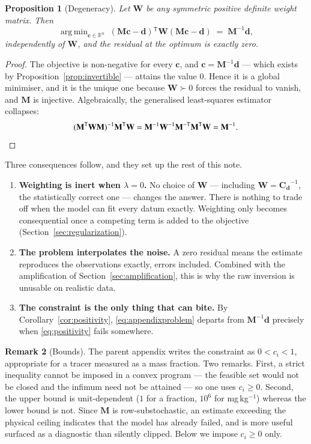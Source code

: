\documentclass[11pt]{article}
\newcommand{\cvec}{\ensuremath{\mathbf{c}}\xspace}
\newcommand{\dvec}{\ensuremath{\mathbf{d}}\xspace}
\newcommand{\Mmat}{\ensuremath{\mathbf{M}}\xspace}
\newcommand{\Wmat}{\ensuremath{\mathbf{W}}\xspace}
\newcommand{\Cd}{\ensuremath{\mathbf{C}_{\mathbf{d}}}\xspace}
\newcommand{\Reals}{\ensuremath{\mathbb{R}}\xspace}
\newcommand{\transpose}{\ensuremath{^{\mathsf{T}}}}
\DeclareMathOperator*{\argmin}{arg\,min}
\newtheorem{theorem}{Proposition}
\theoremstyle{definition}
\newtheorem{remark}[theorem]{Remark}
\begin{document}
\begin{theorem}[Degeneracy]\label{prop:degenerate}
Let $\Wmat$ be any symmetric positive definite weight matrix. Then
\begin{equation}
  \argmin_{\cvec \in \Reals^n} \; (\Mmat\cvec - \dvec)\transpose \Wmat (\Mmat\cvec - \dvec)
  \;=\; \Mmat^{-1}\dvec ,
\end{equation}
independently of $\Wmat$, and the residual at the optimum is exactly zero.
\end{theorem}

\begin{proof}
The objective is non-negative for every \cvec, and $\cvec = \Mmat^{-1}\dvec$ --- which exists
by Proposition~\ref{prop:invertible} --- attains the value $0$. Hence it is a global minimiser, and
it is the unique one because $\Wmat \succ 0$ forces the residual to vanish, and $\Mmat$ is
injective. Algebraically, the generalised least-squares estimator collapses:
\[
  (\Mmat\transpose\Wmat\Mmat)^{-1}\Mmat\transpose\Wmat
  = \Mmat^{-1}\Wmat^{-1}\Mmat^{-\mathsf{T}}\Mmat\transpose\Wmat
  = \Mmat^{-1} . \qedhere
\]
\end{proof}

\noindent Three consequences follow, and they set up the rest of this note.

\begin{enumerate}
  \item \textbf{Weighting is inert when $\lambda = 0$.} No choice of $\Wmat$ --- including
        $\Wmat = \Cd^{-1}$, the statistically correct one --- changes the answer. There is
        nothing to trade off when the model can fit every datum exactly. Weighting only
        becomes consequential once a competing term is added to the objective
        (Section~\ref{sec:regularization}).
  \item \textbf{The problem interpolates the noise.} A zero residual means the estimate
        reproduces the observations exactly, errors included. Combined with the amplification
        of Section~\ref{sec:amplification}, this is why the raw inversion is unusable on
        realistic data.
  \item \textbf{The constraint is the only thing that can bite.} By
        Corollary~\ref{cor:positivity}, \eqref{eq:appendixproblem} departs from
        $\Mmat^{-1}\dvec$ precisely when \eqref{eq:positivity} fails somewhere.
\end{enumerate}

\begin{remark}[Bounds]
The parent appendix writes the constraint as $0 < c_i < 1$, appropriate for a tracer measured
as a mass fraction. Two remarks. First, a strict inequality cannot be imposed in a convex
program --- the feasible set would not be closed and the infimum need not be attained --- so
one uses $c_i \ge 0$. Second, the upper bound is unit-dependent ($1$ for a fraction, $10^6$ for
mg\,kg$^{-1}$) whereas the lower bound is not. Since $\Mmat$ is row-substochastic, an estimate
exceeding the physical ceiling indicates that the model has already failed, and is more useful
surfaced as a diagnostic than silently clipped. Below we impose $c_i \ge 0$ only.
\end{remark}
\end{document}
